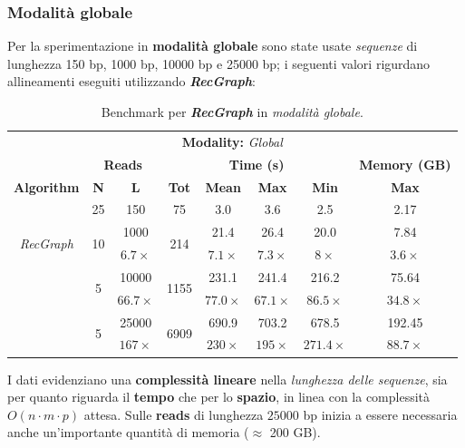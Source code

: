 \subsubsection{Modalità globale}
    Per la sperimentazione in \textbf{modalità globale} sono state usate \emph{sequenze} di lunghezza 150 bp, 1000 bp, 10000 bp e 25000 bp; i seguenti valori rigurdano allineamenti eseguiti utilizzando \textbf{\textit{RecGraph}}:
    \vspace{20pt}
    \begin{table}[h]
        \centering
        \begin{tabular}{|c|c|c|c|c|c|c|c|}
        \hline
        \multicolumn{8}{|c|}{\multirow{2}{*}{\textbf{Modality:} \emph{Global}}} \\
        \multicolumn{8}{|c|}{} \\
        \hline
        & \multicolumn{2}{|c|}{\textbf{Reads}} & \multicolumn{4}{|c|}{\textbf{Time (s)}} & \textbf{Memory (GB)} \\
        \hline
        \textbf{Algorithm} & \textbf{N} & \textbf{L} & \textbf{Tot} & \textbf{Mean} & \textbf{Max} & \textbf{Min} & \textbf{Max} \\
        \hline
        \multirow{4}{*}{\emph{RecGraph}} & 25 & 150 & 75 & 3.0 & 3.6 & 2.5 & 2.17 \\
        \cline{2-8}
        & \multirow{2}{*}{10} & 1000 & \multirow{2}{*}{214} & 21.4 & 26.4 & 20.0 & 7.84 \\
        & & $6.7 \times$ & & $7.1 \times$ & $7.3 \times$ & $8 \times$ & $3.6 \times$ \\
        \cline{2-8}
        & \multirow{2}{*}{5} & 10000 & \multirow{2}{*}{1155} & 231.1 & 241.4 & 216.2 & 75.64 \\
        & & $66.7 \times$ & & $77.0 \times$ & $67.1 \times$ & $86.5 \times$ & $34.8 \times$ \\
        \cline{2-8}
        & \multirow{2}{*}{5} & 25000 & \multirow{2}{*}{6909} & 690.9 & 703.2 & 678.5 & 192.45 \\
        & & $167 \times$ & & $230 \times$ & $195 \times$ & $271.4 \times$ & $88.7 \times$ \\
        \hline
        \end{tabular}
        \caption{Benchmark per \textbf{\textit{RecGraph}} in \emph{modalità globale}.}
        \label{tab:benchmark_RecGraph_global}
    \end{table}
    \vspace{10pt}
    
   I dati evidenziano una \textbf{complessità lineare} nella \textit{lunghezza delle sequenze}, sia per quanto riguarda il \textbf{tempo} che per lo \textbf{spazio}, in linea con la complessità $O(n \cdot m \cdot p)$ attesa. Sulle \textbf{reads} di lunghezza $25000$ bp inizia a essere necessaria anche un'importante quantità di memoria ($\approx$ 200 GB).
   
